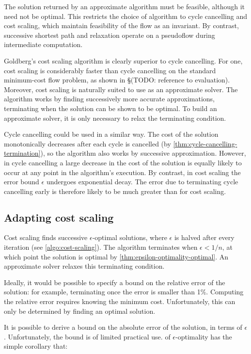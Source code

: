 The solution returned by an approximate algorithm must be feasible, although it need not be optimal. This restricts the choice of algorithm to cycle cancelling and cost scaling, which maintain feasibility of the flow as an invariant. By contrast, successive shortest path and relaxation operate on a pseudoflow during intermediate computation.

Goldberg's cost scaling algorithm is clearly superior to cycle cancelling. For one, cost scaling is considerably faster than cycle cancelling on the standard minimum-cost flow problem, as shown in \S(TODO: reference to evaluation). Moreover, cost scaling is naturally suited to use as an approximate solver. The algorithm works by finding successively more accurate approximations, terminating when the solution can be shown to be optimal. To build an approximate solver, it is only necessary to relax the terminating condition.

Cycle cancelling could be used in a similar way. The cost of the solution monotonically decreases after each cycle is cancelled (by \cref{thm:cycle-cancelling-termination}), so the algorithm also works by successive approximation. However, in cycle cancelling a large decrease in the cost of the solution is equally likely to occur at any point in the algorithm's execution. By contrast, in cost scaling the error bound $\epsilon$ undergoes exponential decay. The error due to terminating cycle cancelling early is therefore likely to be much greater than for cost scaling.

\subsection{Adapting cost scaling}

Cost scaling finds successive $\epsilon$-optimal solutions, where $\epsilon$ is halved after every iteration (see \cref{algo:cost-scaling}). The algorithm terminates when $\epsilon < 1/n$, at which point the solution is optimal by \cref{thm:epsilon-optimality-optimal}. An approximate solver relaxes this terminating condition.

Ideally, it would be possible to specify a bound on the relative error of the solution: for example, terminating once the error is smaller than 1\%. Computing the relative error requires knowing the minimum cost. Unfortunately, this can only be determined by finding an optimal solution.

It is possible to derive a bound on the absolute error of the solution, in terms of $\epsilon$. Unfortunately, the bound is of limited practical use.  of $\epsilon$-optimality has the simple corollary that:

